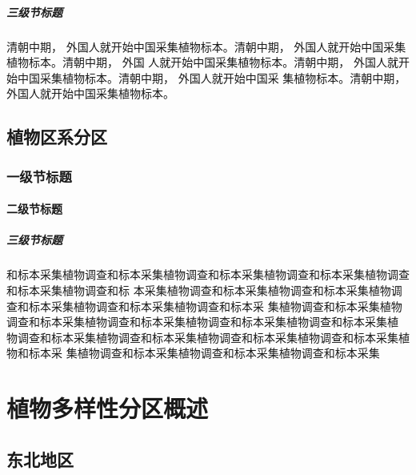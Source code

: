 \documentclass[utf8]{book}
\begin{document}
\subsubsection{三级节标题}

\begin{multicols}{2}

清朝中期， 外国人就开始中国采集植物标本。清朝中期， 外国人就开始中国采集植物标本。清朝中期， 外国
人就开始中国采集植物标本。清朝中期， 外国人就开始中国采集植物标本。清朝中期， 外国人就开始中国采
集植物标本。清朝中期， 外国人就开始中国采集植物标本。

\end{multicols}

\chapter{植物区系分区}

\section{一级节标题}

\subsection{二级节标题}

\subsubsection{三级节标题}

\begin{multicols}{2}
和标本采集植物调查和标本采集植物调查和标本采集植物调查和标本采集植物调查和标本采集植物调查和标
本采集植物调查和标本采集植物调查和标本采集植物调查和标本采集植物调查和标本采集植物调查和标本采
集植物调查和标本采集植物调查和标本采集植物调查和标本采集植物调查和标本采集植物调查和标本采集植
物调查和标本采集植物调查和标本采集植物调查和标本采集植物调查和标本采集植物和标本采
集植物调查和标本采集植物调查和标本采集植物调查和标本采集

\end{multicols}

\part{植物多样性分区概述}

\chapter{东北地区}
\end{document}

